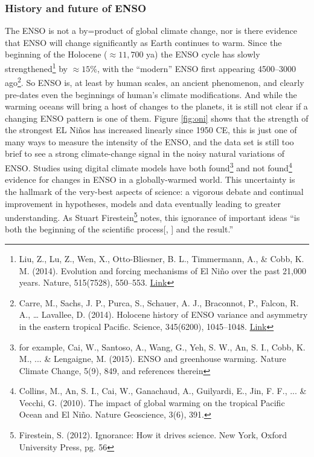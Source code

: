 \documentclass[amstex,12pt]{book}
\begin{document}
{\subsubsection{History and future of ENSO}
The ENSO is not a by=product of global climate change, nor is there evidence that ENSO will change significantly as Earth continues to warm. Since the beginning of the Holocene ($\approx 11,700$ ya) the ENSO cycle has slowly strengthened\footnote{Liu, Z., Lu, Z., Wen, X., Otto-Bliesner, B. L., Timmermann, A., \& Cobb, K. M. (2014). Evolution and forcing mechanisms of El Niño over the past 21,000 years. Nature, 515(7528), 550–553. \href{https://doi.org/10.1038/nature13963}{Link}} by $\approx 15\%$, with the ``modern'' ENSO first appearing  \SIrange{4500}{3000}{\year} ago\footnote{Carre, M., Sachs, J. P., Purca, S., Schauer, A. J., Braconnot, P., Falcon, R. A., … Lavallee, D. (2014). Holocene history of ENSO variance and asymmetry in the eastern tropical Pacific. Science, 345(6200), 1045–1048. \href{https://doi.org/10.1126/science.1252220}{Link}}. So ENSO is, at least by human scales, an ancient phenomenon, and clearly pre-dates even the beginnings of human's climate modifications. And while the warming oceans will bring a host of changes to the planets, it is still not clear if a changing ENSO pattern is one of them. Figure \ref{fig:oni} shows that the strength of the strongest EL Ni\~nos has increased linearly since 1950 CE, this is just one of many ways to measure the intensity of the ENSO, and the data set is still too brief to see a strong climate-change signal in the noisy natural variations of ENSO. Studies using digital climate models have both found\footnote{for example, Cai, W., Santoso, A., Wang, G., Yeh, S. W., An, S. I., Cobb, K. M., ... \& Lengaigne, M. (2015). ENSO and greenhouse warming. Nature Climate Change, 5(9), 849, and references therein} and not found\footnote{Collins, M., An, S. I., Cai, W., Ganachaud, A., Guilyardi, E., Jin, F. F., ... \& Vecchi, G. (2010). The impact of global warming on the tropical Pacific Ocean and El Ni\~no. Nature Geoscience, 3(6), 391.} evidence for changes in ENSO in a globally-warmed world. This uncertainty is the hallmark of the very-best aspects of science: a vigorous debate and continual improvement in hypotheses, models and data eventually leading to greater understanding. As Stuart Firestein\footnote{Firestein, S. (2012). Ignorance: How it drives science. New York, Oxford University Press, pg. 56} notes, this ignorance of important ideas ``is both the beginning of the scientific process[, ] and the result.'' 
$\ $\\
}
\end{document}
